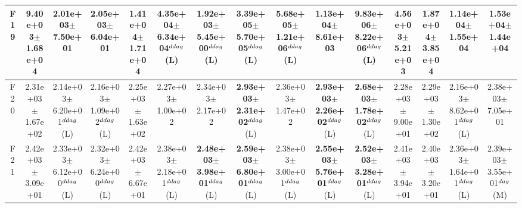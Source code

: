 \begin{table}[!t]
\begin{tabular}{c|cccccccccccccc}
F19  & 9.40e+03$\pm$1.68e+04  & 2.01e+03$\pm$7.50e+01   & 2.05e+03$\pm$6.04e+01   & 1.41e+04$\pm$1.71e+04   & \textbf{4.35e+04$\pm$6.34e+04}$^{\\ddag}$ (L)  & 1.92e+03$\pm$5.45e+00$^{\\ddag}$ (L)  & \textbf{3.39e+05$\pm$5.70e+05}$^{\\ddag}$ (L)  & \textbf{5.68e+05$\pm$1.21e+06}$^{\\ddag}$ (L)  & 1.13e+04$\pm$8.61e+03   & \textbf{9.83e+06$\pm$8.22e+06}$^{\\ddag}$ (L)  & 4.56e+03$\pm$5.21e+03   & 1.87e+04$\pm$3.85e+04   & 1.14e+04$\pm$1.55e+04   & 1.53e+04$\pm$1.44e+04  \\ \hline
F20  & 2.31e+03$\pm$1.67e+02  & 2.14e+03$\pm$6.20e+01$^{\\ddag}$ (L)  & 2.16e+03$\pm$1.09e+02$^{\\ddag}$ (L)  & 2.25e+03$\pm$1.63e+02   & 2.27e+03$\pm$1.00e+02   & 2.34e+03$\pm$2.17e+02   & \textbf{2.93e+03$\pm$2.31e+02}$^{\\ddag}$ (L)  & 2.36e+03$\pm$1.47e+02   & \textbf{2.93e+03$\pm$2.26e+02}$^{\\ddag}$ (L)  & \textbf{2.68e+03$\pm$1.78e+02}$^{\\ddag}$ (L)  & 2.28e+03$\pm$9.00e+01   & 2.29e+03$\pm$1.30e+02   & 2.16e+03$\pm$8.62e+01$^{\\ddag}$ (L)  & 2.38e+03$\pm$7.05e+01  \\ \hline
F21  & 2.42e+03$\pm$3.09e+01  & 2.33e+03$\pm$6.12e+00$^{\\ddag}$ (L)  & 2.32e+03$\pm$6.24e+00$^{\\ddag}$ (L)  & 2.42e+03$\pm$6.67e+01   & 2.38e+03$\pm$2.18e+01$^{\\ddag}$ (L)  & \textbf{2.48e+03$\pm$3.98e+01}$^{\\ddag}$ (L)  & \textbf{2.59e+03$\pm$6.80e+01}$^{\\ddag}$ (L)  & 2.38e+03$\pm$3.00e+01$^{\\ddag}$ (L)  & \textbf{2.55e+03$\pm$5.76e+01}$^{\\ddag}$ (L)  & \textbf{2.52e+03$\pm$3.28e+01}$^{\\ddag}$ (L)  & 2.41e+03$\pm$3.94e+01   & 2.40e+03$\pm$3.20e+01   & 2.36e+03$\pm$1.64e+01$^{\\ddag}$ (L)  & 2.39e+03$\pm$3.55e+01$^{\\dag}$ (M) \\ \hline

\end{tabular}
\end{table}
